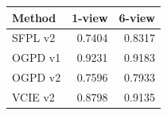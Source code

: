 \begin{tabular}{lrr}
\hline
Method & 1-view & 6-view \\
\hline
SFPL v2 & 0.7404 & 0.8317 \\
OGPD v1 & 0.9231 & 0.9183 \\
OGPD v2 & 0.7596 & 0.7933 \\
VCIE v2 & 0.8798 & 0.9135 \\
\hline
\end{tabular}
